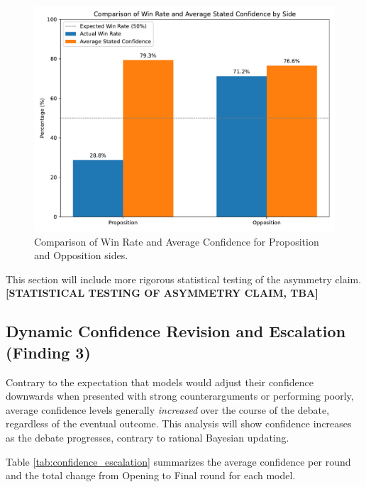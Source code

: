 \documentclass{article}
\begin{document}
\begin{figure}[h]
  \centering
  \includegraphics[width=0.8\linewidth]{figures/side_winrate_confidence_comparison.pdf}
  \caption{Comparison of Win Rate and Average Confidence for Proposition and Opposition sides.}
  \label{fig:position_bias}
\end{figure}

This section will include more rigorous statistical testing of the asymmetry claim. \textbf{[STATISTICAL TESTING OF ASYMMETRY CLAIM, TBA]}

\subsection{Dynamic Confidence Revision and Escalation (Finding 3)}

Contrary to the expectation that models would adjust their confidence downwards when presented with strong counterarguments or performing poorly, average confidence levels generally \textit{increased} over the course of the debate, regardless of the eventual outcome. This analysis will show confidence increases as the debate progresses, contrary to rational Bayesian updating.

Table \ref{tab:confidence_escalation} summarizes the average confidence per round and the total change from Opening to Final round for each model.
\end{document}
